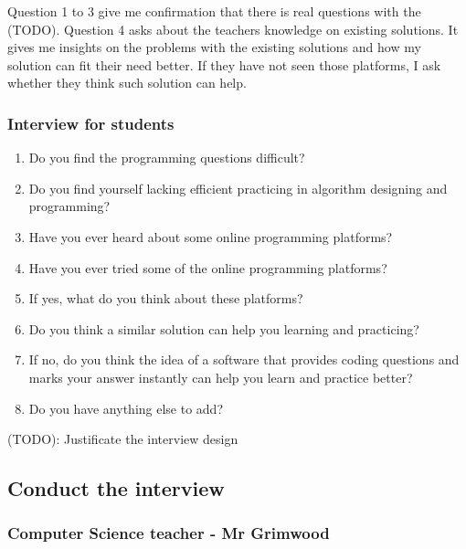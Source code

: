 \documentclass[a4paper]{report}
\begin{document}
Question 1 to 3 give me confirmation that there is real questions with the (TODO). Question 4 asks about the teachers knowledge on existing solutions. It gives me insights on the problems with the existing solutions and how my solution can fit their need better. If they have not seen those platforms, I ask whether they think such solution can help.

\subsubsection{Interview for students}

\begin{enumerate}
    \item Do you find the programming questions difficult?
    \item Do you find yourself lacking efficient practicing in algorithm designing and programming?
    \item Have you ever heard about some online programming platforms?
    \item Have you ever tried some of the online programming platforms?
    \item If yes, what do you think about these platforms?
    \item Do you think a similar solution can help you learning and practicing?
    \item If no, do you think the idea of a software that provides coding questions and marks your answer instantly can help you learn and practice better? 
    \item Do you have anything else to add?
\end{enumerate}

(TODO): Justificate the interview design

\subsection{Conduct the interview}

\subsubsection{Computer Science teacher - Mr Grimwood}
\end{document}

